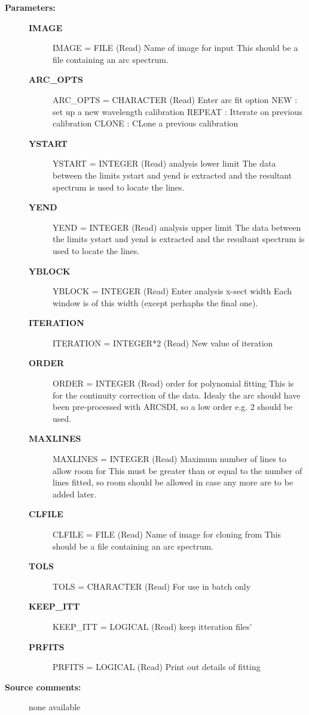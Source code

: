 \begin{description}
\item [\textbf{Parameters:}]
\begin{description}
\item [\textbf{IMAGE}]
IMAGE = FILE (Read)
        Name of image for input
          This should be a file containing an arc spectrum.
\item [\textbf{ARC\_OPTS}]
ARC\_OPTS = CHARACTER (Read)
        Enter arc fit option
          NEW    : set up a new wavelength calibration
          REPEAT : Itterate on previous calibration
          CLONE  : CLone a previous calibration
\item [\textbf{YSTART}]
YSTART = INTEGER (Read)
        analysis lower limit
            The data between the limits ystart and yend is extracted
            and the resultant spectrum is used to locate the lines.
\item [\textbf{YEND}]
YEND = INTEGER (Read)
        analysis upper limit
            The data between the limits ystart and yend is extracted
            and the resultant spectrum is used to locate the lines.
\item [\textbf{YBLOCK}]
    YBLOCK = INTEGER (Read)
        Enter analysis x-sect width
            Each window is of this width (except perhaphs the final one).
\item [\textbf{ITERATION}]
    ITERATION = INTEGER*2 (Read)
        New value of iteration
\item [\textbf{ORDER}]
    ORDER = INTEGER (Read)
        order for polynomial fitting
          This is for the continuity correction of the data. Idealy the
          arc should have been pre-processed with ARCSDI, so a low
          order e.g. 2 should be used.
\item [\textbf{MAXLINES}]
    MAXLINES = INTEGER (Read)
        Maximum number of lines to allow room for
          This must be greater than or equal to the number of lines
          fitted, so room should be allowed in case any more are
          to be added later.
\item [\textbf{CLFILE}]
    CLFILE = FILE (Read)
        Name of image for cloning from
          This should be a file containing an arc spectrum.
\item [\textbf{TOLS}]
    TOLS = CHARACTER (Read)
        For use in batch only
\item [\textbf{KEEP\_ITT}]
    KEEP\_ITT = LOGICAL (Read)
        keep itteration files'
\item [\textbf{PRFITS}]
    PRFITS = LOGICAL (Read)
        Print out details of fitting
\end{description}

\item [\textbf{Source comments:}]
\begin{terminalv}
  none available

\end{terminalv}
\end{description}
